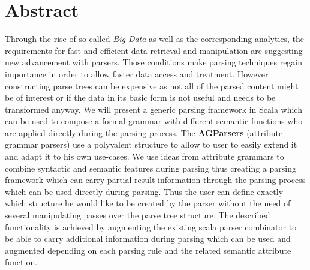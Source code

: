 \section{Abstract}
Through the rise of so called \emph{Big Data} as well as the corresponding analytics, the requirements for fast and efficient data retrieval and manipulation are suggesting new advancement with parsers. Those conditions make parsing techniques regain importance in order to allow faster data access and treatment. However constructing parse trees can be expensive as not all of the parsed content might be of interest or if the data in its basic form is not useful and needs to be transformed anyway.
We will present a generic parsing framework in Scala which can be used to compose a formal grammar with different semantic functions who are applied directly during the parsing process. The \textbf{AGParsers} (attribute grammar parsers) use a polyvalent structure to allow to user to easily extend it and adapt it to his own use-cases.
We use ideas from attribute grammars to combine syntactic and semantic features during parsing thus creating a parsing framework which can carry partial result information through the parsing process which can be used directly during parsing. Thus the user can define exactly which structure he would like to be created by the parser without the need of several manipulating passes over the parse tree structure.
The described functionality is achieved by augmenting the existing scala parser combinator to be able to carry additional information during parsing which can be used and augmented depending on each parsing rule and the related semantic attribute function.
